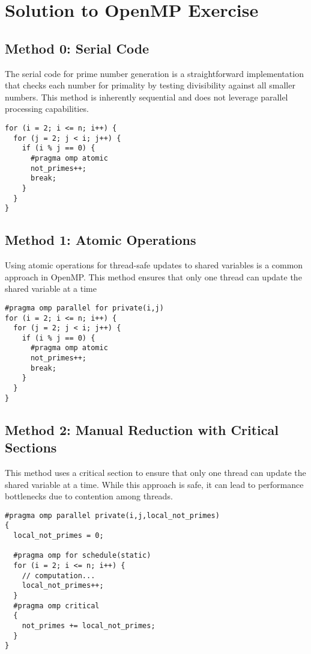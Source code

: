 \documentclass[11pt]{article}
\begin{document}
\section{Solution to OpenMP Exercise}

\subsection{Method 0: Serial Code}

The serial code for prime number generation is a straightforward implementation that checks each number for primality by testing divisibility against all smaller numbers. This method is inherently sequential and does not leverage parallel processing capabilities.

\begin{verbatim}
for (i = 2; i <= n; i++) {
  for (j = 2; j < i; j++) {
    if (i % j == 0) {
      #pragma omp atomic
      not_primes++;
      break;
    }
  }
}
\end{verbatim}

\subsection{Method 1: Atomic Operations}

Using atomic operations for thread-safe updates to shared variables is a common approach in OpenMP. This method ensures that only one thread can update the shared variable at a time

\begin{verbatim}
#pragma omp parallel for private(i,j)
for (i = 2; i <= n; i++) {
  for (j = 2; j < i; j++) {
    if (i % j == 0) {
      #pragma omp atomic
      not_primes++;
      break;
    }
  }
}
\end{verbatim}


\subsection{Method 2: Manual Reduction with Critical Sections}

This method uses a critical section to ensure that only one thread can update the shared variable at a time. While this approach is safe, it can lead to performance bottlenecks due to contention among threads.

\begin{verbatim}
#pragma omp parallel private(i,j,local_not_primes)
{
  local_not_primes = 0;

  #pragma omp for schedule(static)
  for (i = 2; i <= n; i++) {
    // computation...
    local_not_primes++;
  }
  #pragma omp critical
  {
    not_primes += local_not_primes;
  }
}

\end{verbatim}
\end{document}
